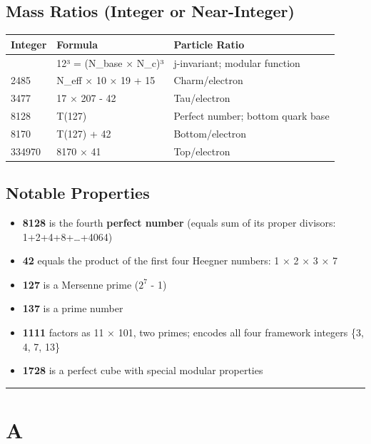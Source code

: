 \documentclass[
  11pt,
  letterpaper,
  twoside,
  openright]{book}
\providecommand{\tightlist}{%
  \setlength{\itemsep}{0pt}\setlength{\parskip}{0pt}}
\begin{document}
\subsection{Mass Ratios (Integer or
Near-Integer)}\label{mass-ratios-integer-or-near-integer}

\begin{longtable}[]{@{}lll@{}}
\toprule\noalign{}
Integer & Formula & Particle Ratio \\
\midrule\noalign{}
\endhead
\bottomrule\noalign{}
\endlastfoot
1728 & 12³ = (N\_base × N\_c)³ & j-invariant; modular function \\
2485 & N\_eff × 10 × 19 + 15 & Charm/electron \\
3477 & 17 × 207 - 42 & Tau/electron \\
8128 & T(127) & Perfect number; bottom quark base \\
8170 & T(127) + 42 & Bottom/electron \\
334970 & 8170 × 41 & Top/electron \\
\end{longtable}

\subsection{Notable Properties}\label{notable-properties}

\begin{itemize}
\tightlist
\item
  \textbf{8128} is the fourth \textbf{perfect number} (equals sum of its
  proper divisors: 1+2+4+8+\ldots+4064)
\item
  \textbf{42} equals the product of the first four Heegner numbers: 1 ×
  2 × 3 × 7
\item
  \textbf{127} is a Mersenne prime (\(2^7\) - 1)
\item
  \textbf{137} is a prime number
\item
  \textbf{1111} factors as 11 × 101, two primes; encodes all four
  framework integers \{3, 4, 7, 13\}
\item
  \textbf{1728} is a perfect cube with special modular properties
\end{itemize}

\begin{center}\rule{0.5\linewidth}{0.5pt}\end{center}

\section{A}\label{a}
\end{document}
